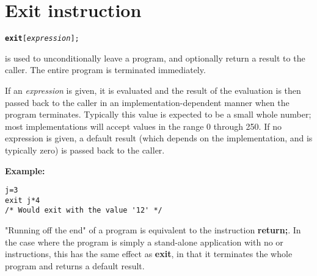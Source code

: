 \chapter{Exit instruction}\label{refexit}
\begin{shaded}
\begin{alltt}
\textbf{exit} [\emph{expression}];
\end{alltt}
\end{shaded}
  is used to unconditionally leave a program, and
optionally return a result to the caller.
The entire program is terminated immediately.

If an \emph{expression} is given, it is evaluated and the result
of the evaluation is then passed back to the caller in an
implementation-dependent manner when the program terminates.
Typically this value is expected to be a small whole number; most
implementations will accept values in the range 0 through 250.
If no expression is given, a default result (which depends on the
implementation, and is typically zero) is passed back to the caller.

\textbf{Example:}
\begin{lstlisting}
j=3
exit j*4
/* Would exit with the value '12' */
\end{lstlisting}
 "Running off the end" of a program is equivalent to the
instruction \textbf{return;}.  In the case where the program is simply
a stand-alone application with no  or 
instructions, this has the same effect as \textbf{exit}, in that it
terminates the whole program and returns a default result.
